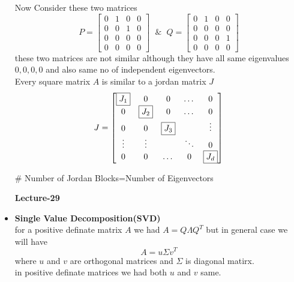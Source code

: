 \documentclass[a4paper,11pt]{article}
\numberwithin{equation}{section}
\begin{document}
\begin{itemize}
Now Consider these two matrices
\[P=\begin{bmatrix}
    0&1&0&0\\0&0&1&0\\0&0&0&0\\0&0&0&0
\end{bmatrix} \hspace{7pt} \& \hspace{7pt} Q=\begin{bmatrix}
    0&1&0&0\\0&0&0&0\\0&0&0&1\\0&0&0&0
\end{bmatrix}
\]
these two matrices are not similar although they have all same eigenvalues $0,0,0,0$ and also same no of independent eigenvectors.\\

Every square matrix $A$ is similar to a jordan matrix $J$
\[J=\begin{bmatrix}
    \textbf{\boxed{J_1}} &0&0&\dots&0\\
    0& \textbf{\boxed{J_2}}&0&\dots&0\\
    0&0& \textbf{\boxed{J_3}}&&\vdots\\
    \vdots&\vdots&&\ddots&0\\
    0&0&\dots&0& \textbf{\boxed{J_d}}
\end{bmatrix}\]

\# Number of Jordan Blocks=Number of Eigenvectors

\begin{center}
    \Huge{\textbf{Lecture-29}}
\end{center}
\vspace{5pt}
\item \textbf{Single Value Decomposition(SVD)}\\
    
for a positive definate matrix $A$ we had $A=Q\varLambda Q^T$ but in general case we will have \[A=u\Sigma v^T\] where $u$ and $v$ are orthogonal matrices and $\Sigma$ is diagonal matirx.\\
\hspace{1cm} in positive definate matrices we had both $u$ and $v$ same.\\


\end{itemize}
\end{document}
